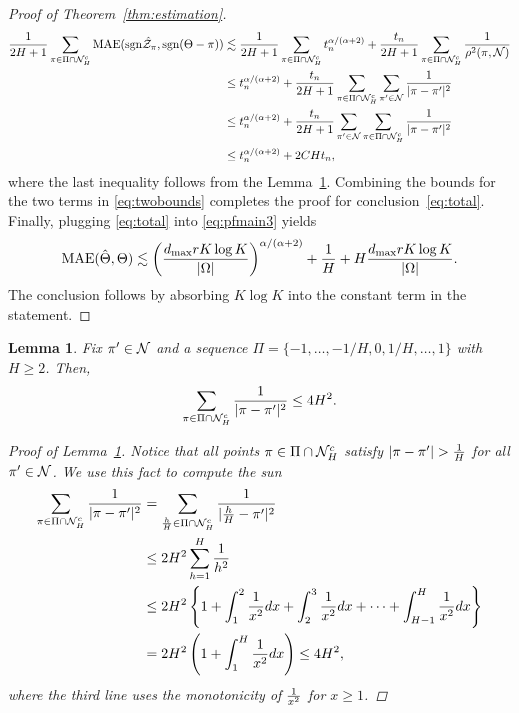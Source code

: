 \documentclass[11pt]{article}
\theoremstyle{plain}
\newtheorem{lem}{Lemma}
\theoremstyle{definition}
\def\sign{\textup{sgn}}
\begin{document}
\begin{proof}[Proof of Theorem~\ref{thm:estimation}]
\begin{align}
{1\over 2H+1}\sum_{\pi \in \Pi\cap \tN_H^c} \textup{MAE}(\sign \hat \tZ_\pi, \sign (\Theta-\pi)) &\lesssim  {1\over 2H+1}\sum_{\pi\in \Pi\cap \tN_H^c} t_n^{\alpha/(\alpha+2)}+{t_n\over 2H+1}\sum_{\pi \in \Pi\cap \tN_H^c}{1\over \rho^2(\pi, \tN)}\\
&\leq t_n^{\alpha/(\alpha+2)}+{t_n\over 2H+1} \sum_{\pi \in \Pi\cap \tN_H^c} \sum_{\pi' \in \tN}{1\over |\pi-\pi'|^2}\\
&\leq  t_n^{\alpha/(\alpha+2)}+{t_n\over 2H+1} \sum_{\pi'\in \tN} \sum_{\pi \in \Pi\cap \tN_H^c}{1\over |\pi-\pi'|^2}\\
&\leq t_n^{\alpha/(\alpha+2)}+ 2CHt_n,
\end{align}
where the last inequality follows from the Lemma~\ref{lem:H}.  Combining the bounds for the two terms in \eqref{eq:twobounds} completes the proof for conclusion~\eqref{eq:total}. Finally, plugging \eqref{eq:total} into \eqref{eq:pfmain3} yields
\begin{align}
\text{MAE}(\hat\Theta,\Theta)\lesssim \left(d_{\max}rK\log K\over |\Omega|\right)^{\alpha/(\alpha+2)}+\frac{1}{H}+H{d_{\max}rK\log K\over |\Omega|}.
 \end{align}
The conclusion follows by absorbing $K\log K$ into the constant term in the statement. 
\end{proof}


\begin{lem}\label{lem:H}
Fix $\pi'\in\mathcal{N}$ and a sequence $\Pi=\{-1,\ldots,-1/H,0,1/H,\ldots,1\}$ with $H\geq 2$. Then, 
\[
\sum_{\pi \in \Pi\cap \mathcal{N}_H^c}{1\over 
|\pi-\pi'|^2}\leq 4H^2. 
\]
\begin{proof}[Proof of Lemma~\ref{lem:H}]
Notice that all points $\pi\in\Pi\cap\mathcal{N}_H^c$ satisfy $|\pi-\pi'|>{1\over H}$ for all $\pi'\in\mathcal{N}$. We use this fact to compute the sun
\begin{align}
   \sum_{\pi \in \Pi\cap \mathcal{N}_H^c}{1\over |\pi-\pi'|^2}&= \sum_{\frac{h}{H}\in\Pi\cap \mathcal{N}_H^c } {1\over |\frac{h}{H}-\pi'|^2}\\
   &\leq 2H^2\sum_{h=1}^{H}{1 \over h^2}\\
 &\leq 2H^2\left\{ 1+\int_{1}^2{1\over x^2}dx+ \int_{2}^3{1\over x^2}dx+\cdots + \int_{H-1}^H{1\over x^2}dx\right\}\\
&= 2H^2\left(1+\int^{H}_{1}{1\over x^2}dx\right) \leq 4H^2,
\end{align}
 where the third line uses the monotonicity of ${1\over x^2}$ for $x\geq 1$. 
 \end{proof}
\end{lem}
\end{document}
